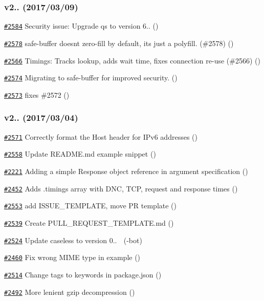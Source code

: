 \subsubsection*{v2.. (2017/03/09)}


\begin{DoxyItemize}
\item \href{https://github.com/request/request/pull/2584}{\tt \#2584} Security issue\+: Upgrade qs to version 6.. ()
\item \href{https://github.com/request/request/pull/2578}{\tt \#2578} safe-\/buffer doesn\textquotesingle{}t zero-\/fill by default, its just a polyfill. (\#2578) ()
\item \href{https://github.com/request/request/pull/2566}{\tt \#2566} Timings\+: Tracks \textquotesingle{}lookup\textquotesingle{}, adds \textquotesingle{}wait\textquotesingle{} time, fixes connection re-\/use (\#2566) ()
\item \href{https://github.com/request/request/pull/2574}{\tt \#2574} Migrating to safe-\/buffer for improved security. ()
\item \href{https://github.com/request/request/pull/2573}{\tt \#2573} fixes \#2572 ()
\end{DoxyItemize}

\subsubsection*{v2.. (2017/03/04)}


\begin{DoxyItemize}
\item \href{https://github.com/request/request/pull/2571}{\tt \#2571} Correctly format the Host header for I\+Pv6 addresses ()
\item \href{https://github.com/request/request/pull/2558}{\tt \#2558} Update R\+E\+A\+D\+M\+E.\+md example snippet ()
\item \href{https://github.com/request/request/pull/2221}{\tt \#2221} Adding a simple Response object reference in argument specification ()
\item \href{https://github.com/request/request/pull/2452}{\tt \#2452} Adds .timings array with D\+NC, T\+CP, request and response times ()
\item \href{https://github.com/request/request/pull/2553}{\tt \#2553} add I\+S\+S\+U\+E\+\_\+\+T\+E\+M\+P\+L\+A\+TE, move PR template ()
\item \href{https://github.com/request/request/pull/2539}{\tt \#2539} Create P\+U\+L\+L\+\_\+\+R\+E\+Q\+U\+E\+S\+T\+\_\+\+T\+E\+M\+P\+L\+A\+T\+E.\+md ()
\item \href{https://github.com/request/request/pull/2524}{\tt \#2524} Update caseless to version 0.. 🚀 (-\/bot)
\item \href{https://github.com/request/request/pull/2460}{\tt \#2460} Fix wrong M\+I\+ME type in example ()
\item \href{https://github.com/request/request/pull/2514}{\tt \#2514} Change tags to keywords in package.\+json ()
\item \href{https://github.com/request/request/pull/2492}{\tt \#2492} More lenient gzip decompression ()
\end{DoxyItemize}

